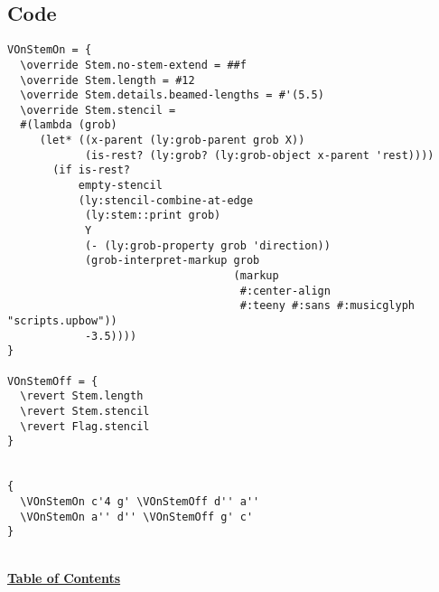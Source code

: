 \documentclass[11pt, oneside]{book}   	%
\begin{document}
\subsection{Code}
\begin{verbatim}
VOnStemOn = {
  \override Stem.no-stem-extend = ##f
  \override Stem.length = #12
  \override Stem.details.beamed-lengths = #'(5.5)
  \override Stem.stencil =
  #(lambda (grob)
     (let* ((x-parent (ly:grob-parent grob X))
            (is-rest? (ly:grob? (ly:grob-object x-parent 'rest))))
       (if is-rest?
           empty-stencil
           (ly:stencil-combine-at-edge
            (ly:stem::print grob)
            Y
            (- (ly:grob-property grob 'direction))
            (grob-interpret-markup grob
                                   (markup
                                    #:center-align
                                    #:teeny #:sans #:musicglyph "scripts.upbow"))
            -3.5))))
}

VOnStemOff = {
  \revert Stem.length
  \revert Stem.stencil
  \revert Flag.stencil
}


{
  \VOnStemOn c'4 g' \VOnStemOff d'' a''
  \VOnStemOn a'' d'' \VOnStemOff g' c'
}
\end{verbatim}
\hyperref[sec:toc]{\\ \textbf{Table of Contents}}

\vfill \break




\clearpage





\backmatter

\printbibliography[heading=bibintoc, title={Bibliography}]
\end{document}
